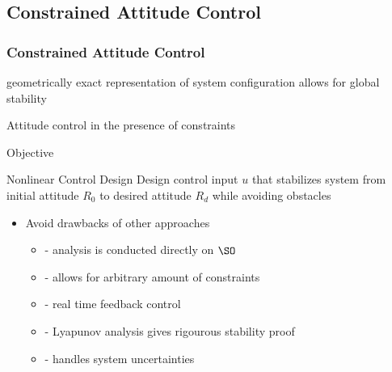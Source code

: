 \subsection*{Constrained Attitude Control}



\begin{frame}[t]\frametitle{Constrained Attitude Control}
    
geometrically exact representation of system configuration allows for global stability

Attitude control in the presence of constraints

\end{frame}

\begin{frame}{Objective} %

    \begin{block}{Nonlinear Control Design}
        Design control input \( u \) that stabilizes system from initial attitude \( R_0 \) to desired attitude \( R_d \) while avoiding obstacles
    \end{block}
    \pause
    \vs
    \begin{itemize}
        \item Avoid drawbacks of other approaches 
        \begin{itemize}
            \item {} - analysis is conducted directly on \( \SO \) 
            \item {} - allows for arbitrary amount of constraints
            \item {} - real time feedback control
            \item {} - Lyapunov analysis gives rigourous stability proof
            \item {} - handles system uncertainties
        \end{itemize}
    \end{itemize}
\end{frame}

